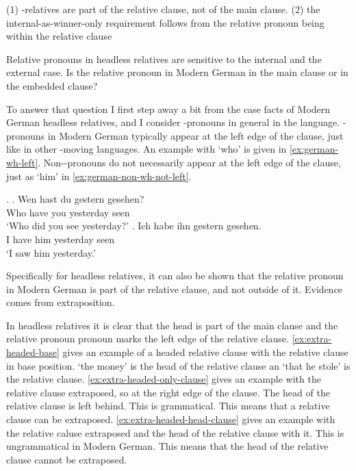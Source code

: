 (1) -relatives are part of the relative clause, not of the main clause. (2) the internal-as-winner-only requirement follows from the relative pronoun being within the relative clause

Relative pronouns in headless relatives are sensitive to the internal and the external case. Is the relative pronoun in Modern German in the main clause or in the embedded clause?

To answer that question I first step away a bit from the case facts of Modern German headless relatives, and I consider -pronouns in general in the language. -pronouns in Modern German typically appear at the left edge of the clause, just like in other -moving languages. An example with  `who' is given in \ref{ex:german-wh-left}. Non--pronouns do not necessarily appear at the left edge of the clause, just as  `him' in \ref{ex:german-non-wh-not-left}.

\ex.
\ag. Wen hast du gestern gesehen?\\
 Who have you yesterday seen\\
 `Who did you see yesterday?'\label{ex:german-wh-left}
\bg. Ich habe ihn gestern gesehen.\\
 I have him yesterday seen\\
 `I saw him yesterday.'\label{ex:german-non-wh-not-left}

Specifically for headless relatives, it can also be shown that the relative pronoun in Modern German is part of the relative clause, and not outside of it. Evidence comes from extraposition.

In headless relatives it is clear that the head is part of the main clause and the relative pronoun pronoun marks the left edge of the relative clause. \ref{ex:extra-headed-base} gives an example of a headed relative clause with the relative clause in base position.  `the money' is the head of the relative clause an  `that he stole' is the relative clause.
\ref{ex:extra-headed-only-clause} gives an example with the relative clause extraposed, so at the right edge of the clause. The head of the relative clause is left behind. This is grammatical. This means that a relative clause can be extraposed.
\ref{ex:extra-headed-head-clause} gives an example with the relative caluse extraposed and the head of the relative clause with it. This is ungrammatical in Modern German. This means that the head of the relative clause cannot be extraposed.

